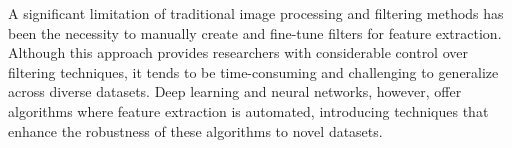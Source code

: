 A significant limitation of traditional image processing and filtering methods has been the necessity to manually create and fine-tune filters for feature extraction.
Although this approach provides researchers with considerable control over filtering techniques, it tends to be time-consuming and challenging to generalize across diverse datasets.
Deep learning and neural networks, however, offer algorithms where feature extraction is automated, introducing techniques that enhance the robustness of these algorithms to novel datasets.





